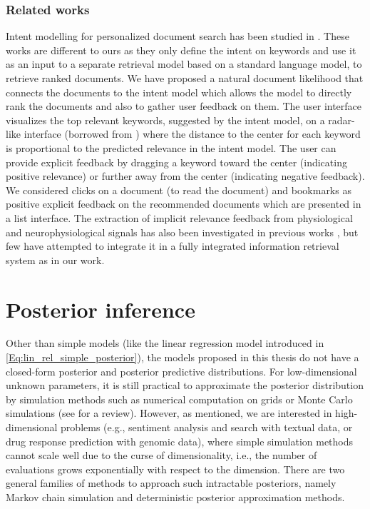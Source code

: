 \documentclass[dissertation,math,vertlayout,pdfa,colorlinks]{aaltoseries}
\begin{document}
\subsubsection{Related works}
Intent modelling for personalized document search has been studied in  \cite{GlowIUI2013,ruotsalo2015interactive,Ruotsalo2018}. These works are different to ours as they only define the intent on keywords and use it as an input to a separate retrieval model based on a standard language model, to retrieve ranked documents. We have proposed a natural document likelihood that connects the documents to the intent model which allows the model to directly rank the documents and also to gather user feedback on them. The user interface visualizes the top relevant keywords, suggested by the intent model, on a radar-like interface (borrowed from \cite{GlowIUI2013}) where the distance to the center for each keyword is proportional to the predicted relevance in the intent model. The user can provide explicit feedback by dragging a keyword toward the center (indicating positive relevance) or further away from the center (indicating negative feedback). We considered clicks on a document (to read the document) and bookmarks as positive explicit feedback on the recommended documents which are presented in a list interface. The extraction of implicit relevance feedback from physiological and neurophysiological signals has also been investigated in previous works \cite{OSwald_2015,Manuel2016natural}, but few have attempted to integrate it in a fully integrated information retrieval system as in our work.



\section{Posterior inference} \label{posteriro_inf}
Other than simple models (like the linear regression model introduced in \ref{Eq:lin_rel_simple_posterior}), the models proposed in this thesis do not have a closed-form posterior and posterior predictive distributions. For low-dimensional unknown parameters, it is still practical to approximate the posterior distribution by simulation methods such as numerical computation on grids or Monte Carlo simulations (see \cite[Chapter~10]{Gelman2013} for a review). However, as mentioned, we are interested in high-dimensional problems (e.g., sentiment analysis and search with textual data, or drug response prediction with genomic data), where simple simulation methods cannot scale well due to the curse of dimensionality, i.e., the number of evaluations grows exponentially with respect to the dimension. There are two general families of methods to approach such intractable posteriors, namely Markov chain simulation and deterministic posterior approximation methods.
\end{document}
